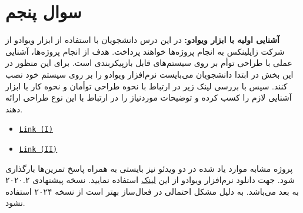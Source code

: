 \section{سوال پنجم}
\textbf{آشنایی اولیه با ابزار ویوادو:} در این درس دانشجویان با استفاده از ابزار ویوادو از شرکت زایلینکس به انجام پروژه‌ها خواهند پرداخت. هدف از انجام پروژه‌ها، آشنایی عملی با طراحی توأم بر روی سیستم‌های قابل بازپیکربندی است. برای این منظور در این بخش در ابتدا دانشجویان می‌بایست نرم‌افزار ویوادو را بر روی سیستم خود نصب کنند. سپس با بررسی لینک زیر در ارتباط با نحوه طراحی توأمان و نحوه کار با ابزار آشنایی لازم را کسب کرده و توضیحات موردنیاز را در ارتباط با این نوع طراحی ارائه دهند.

\begin{latin}
	\begin{itemize}
		\item 
		\texttt{\textcolor{magenta}{\href{https://www.youtube.com/watch?v=_odNhKOZjEo}{Link (I)}}}
		
		\item 
		\texttt{\textcolor{magenta}{\href{https://www.youtube.com/watch?v=AOy5l36DroY&t=0s}{Link (II)}}}
	\end{itemize}
\end{latin}

پروژه مشابه موارد یاد شده در دو ویدئو نیز بایستی به همراه پاسخ تمرین‌ها بارگذاری شود. جهت دانلود نرم‌افزار ویوادو از این 
\href{https://downloadly.ir/software/engineering-specialized/xilinx-vivado-design-suite/}{لینک}
استفاده نمایید. نسخه پیشنهادی ۲۰۲۰.۲ به بعد می‌باشد. به دلیل مشکل احتمالی در فعال‌ساز بهتر است از نسخه ۲۰۲۴ استفاده نشود. \newline \newline


